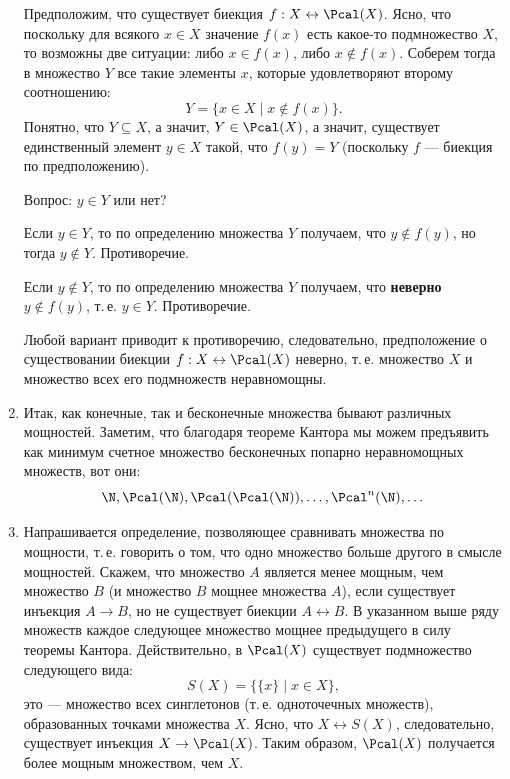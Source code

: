 \begin{enumerate}
Предположим, что существует биекция $f:X\leftrightarrow\Pcal(X)$. Ясно, что поскольку для всякого $x\in X$ значение $f(x)$ есть какое-то подмножество $X$, то возможны две ситуации: либо $x\in f(x)$, либо $x\notin f(x)$. Соберем тогда в множество $Y$ все такие элементы $x$, которые удовлетворяют второму соотношению:
$$
Y=\{x\in X\mid x\notin f(x)\}.
$$
Понятно, что $Y\subseteq X$, а значит, $Y\in\Pcal(X)$, а значит, существует единственный элемент $y\in X$ такой, что $f(y)=Y$ (поскольку $f$ --- биекция по предположению).

Вопрос: $y\in Y$ или нет?

Если $y\in Y$, то по определению множества $Y$ получаем, что $y\notin f(y)$, но тогда $y\notin Y$. Противоречие.

Если $y\notin Y$, то по определению множества $Y$ получаем, что \textbf{неверно} $y\notin f(y)$, т.\,е. $y\in Y$. Противоречие.

Любой вариант приводит к противоречию, следовательно, предположение о существовании биекции $f:X\leftrightarrow\Pcal(X)$ неверно, т.\,е. множество $X$ и множество всех его подмножеств неравномощны.
\epf



\item Итак, как конечные, так и бесконечные множества бывают различных мощностей. Заметим, что благодаря теореме Кантора мы можем предъявить как минимум счетное множество бесконечных попарно неравномощных множеств, вот они:
$$
\N,\Pcal(\N),\Pcal(\Pcal(\N)),\dots,\Pcal^n(\N),\dots
$$

\item Напрашивается определение, позволяющее сравнивать множества по мощности, т.\,е. говорить о том, что одно множество больше другого в смысле мощностей. Скажем, что множество $A$ является менее мощным, чем множество $B$ (и множество $B$ мощнее множества $A$), если существует инъекция $A\to B$, но не существует биекции $A\leftrightarrow B$. В указанном выше ряду множеств каждое следующее множество мощнее предыдущего в силу теоремы Кантора.
Действительно, в $\Pcal(X)$ существует подмножество следующего вида:
$$
S(X)=\{\{x\}\mid x\in X\},
$$
это --- множество всех синглетонов (т.\,е. одноточечных множеств), образованных точками множества $X$. Ясно, что $X\leftrightarrow S(X)$, следовательно, существует инъекция $X\to\Pcal(X)$. Таким образом, $\Pcal(X)$ получается более мощным множеством, чем $X$.


\end{enumerate}
